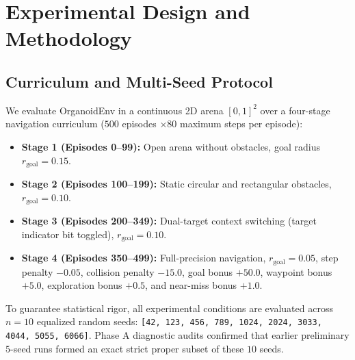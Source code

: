 \documentclass[journal]{IEEEtran}
\begin{document}
\section{Experimental Design and Methodology}
\label{sec:experimental_design}

\subsection{Curriculum and Multi-Seed Protocol}
We evaluate OrganoidEnv in a continuous 2D arena $[0, 1]^2$ over a four-stage navigation curriculum ($500$ episodes $\times 80$ maximum steps per episode):
\begin{itemize}
    \item \textbf{Stage 1 (Episodes 0--99):} Open arena without obstacles, goal radius $r_{\mathrm{goal}} = 0.15$.
    \item \textbf{Stage 2 (Episodes 100--199):} Static circular and rectangular obstacles, $r_{\mathrm{goal}} = 0.10$.
    \item \textbf{Stage 3 (Episodes 200--349):} Dual-target context switching (target indicator bit toggled), $r_{\mathrm{goal}} = 0.10$.
    \item \textbf{Stage 4 (Episodes 350--499):} Full-precision navigation, $r_{\mathrm{goal}} = 0.05$, step penalty $-0.05$, collision penalty $-15.0$, goal bonus $+50.0$, waypoint bonus $+5.0$, exploration bonus $+0.5$, and near-miss bonus $+1.0$.
\end{itemize}

To guarantee statistical rigor, all experimental conditions are evaluated across $n = 10$ equalized random seeds: \texttt{[42, 123, 456, 789, 1024, 2024, 3033, 4044, 5055, 6066]}. Phase A diagnostic audits confirmed that earlier preliminary $5$-seed runs formed an exact strict proper subset of these $10$ seeds.
\end{document}
